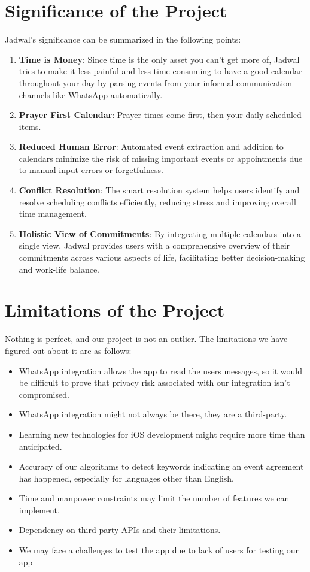 \documentclass[12pt,a4paper]{report}
\begin{document}
\section{Significance of the Project}

Jadwal's significance can be summarized in the following points:
\begin{enumerate}
    \item \textbf{Time is Money}: Since time is the only asset you can't get more of, Jadwal tries to make it less painful and less time consuming to have a good calendar throughout your day by parsing events from your informal communication channels like WhatsApp automatically.
    \item \textbf{Prayer First Calendar}: Prayer times come first, then your daily scheduled items.
    \item \textbf{Reduced Human Error}: Automated event extraction and addition to calendars minimize the risk of missing important events or appointments due to manual input errors or forgetfulness.
    \item \textbf{Conflict Resolution}: The smart resolution system helps users identify and resolve scheduling conflicts efficiently, reducing stress and improving overall time management.
    \item \textbf{Holistic View of Commitments}: By integrating multiple calendars into a single view, Jadwal provides users with a comprehensive overview of their commitments across various aspects of life, facilitating better decision-making and work-life balance.
\end{enumerate}

\section{Limitations of the Project}

Nothing is perfect, and our project is not an outlier. The limitations we have figured out about it are as follows:
\begin{itemize}
    \item WhatsApp integration allows the app to read the users messages, so it would be difficult to prove that privacy risk associated with our integration isn't compromised.
    \item WhatsApp integration might not always be there, they are a third-party.
    \item Learning new technologies for iOS development might require more time than anticipated.
    \item Accuracy of our algorithms to detect keywords indicating an event agreement has happened, especially for languages other than English.
    \item Time and manpower constraints may limit the number of features we can implement.
    \item Dependency on third-party APIs and their limitations.
    \item We may face a challenges to test the app due to lack of users for testing our app
\end{itemize}
\end{document}

